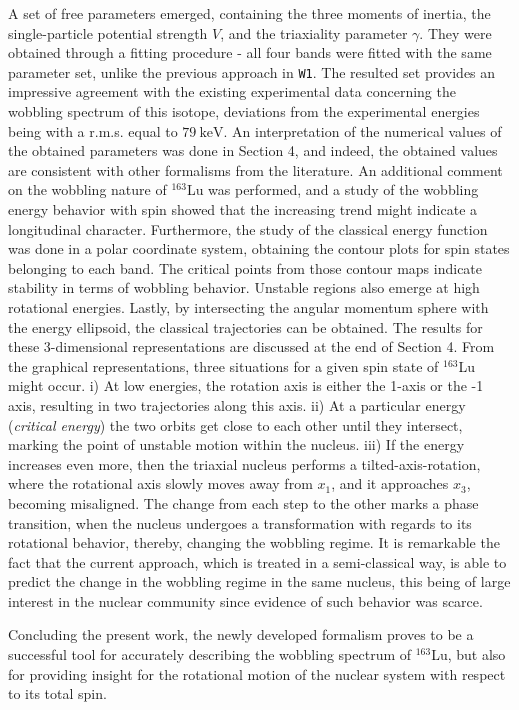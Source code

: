 \documentclass[11pt]{article}
\begin{document}
A set of free parameters emerged, containing the three moments of inertia, the single-particle potential strength $V$, and the triaxiality parameter $\gamma$. They were obtained through a fitting procedure - all four bands were fitted with the same parameter set, unlike the previous approach in \texttt{W1}. The resulted set provides an impressive agreement with the existing experimental data concerning the wobbling spectrum of this isotope, deviations from the experimental energies being with a r.m.s. equal to $79\ \text{keV}$. An interpretation of the numerical values of the obtained parameters was done in Section 4, and indeed, the obtained values are consistent with other formalisms from the literature. An additional comment on the wobbling nature of $^{163}$Lu was performed, and a study of the wobbling energy behavior with spin showed that the increasing trend might indicate a longitudinal character. Furthermore, the study of the classical energy function was done in a polar coordinate system, obtaining the contour plots for spin states belonging to each band. The critical points from those contour maps indicate stability in terms of wobbling behavior. Unstable regions also emerge at high rotational energies. Lastly, by intersecting the angular momentum sphere  with the energy ellipsoid, the classical trajectories can be obtained. The results for these 3-dimensional representations are discussed at the end of Section 4. From the graphical representations, three situations for a given spin state of $^{163}$Lu might occur. i) At low energies, the rotation axis is either the 1-axis or the -1 axis, resulting in two trajectories along this axis. ii) At a particular energy (\emph{critical energy}) the two orbits get close to each other until they intersect, marking the point of unstable motion within the nucleus. iii) If the energy increases even more, then the triaxial nucleus performs a tilted-axis-rotation, where the rotational axis slowly moves away from $x_1$, and it approaches $x_3$, becoming misaligned. The change from each step to the other marks a phase transition, when the nucleus undergoes a transformation with regards to its rotational behavior, thereby, changing the wobbling regime. It is remarkable the fact that the current approach, which is treated in a semi-classical way, is able to predict the change in the wobbling regime in the same nucleus, this being of large interest in the nuclear community since evidence of such behavior was scarce.

Concluding the present work, the newly developed formalism proves to be a successful tool for accurately describing the wobbling spectrum of $^{163}$Lu, but also for providing insight for the rotational motion of the nuclear system with respect to its total spin.
\end{document}
